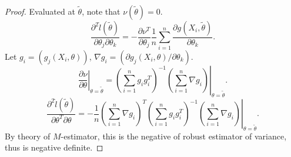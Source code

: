 \begin{proof}
Evaluated at $\tilde{\theta}$, note that $\nu\left(\tilde{\theta}\right)=0$.
\[
\frac{\partial^{2}\hat{l}\left(\tilde{\theta}\right)}{\partial\theta_{j}\partial\theta_{k}}=-\frac{\partial\nu^{T}}{\partial\theta_{j}}\frac{1}{n}\sum_{i=1}^{n}\frac{\partial g\left(X_{i},\tilde{\theta}\right)}{\partial\theta_{k}}.
\]
Let $g_{i}=\left(g_{j}\left(X_{i},\theta\right)\right)$, $\nabla g_{i}=\left({\partial g_{j}\left(X_{i},\theta\right)} / {\partial\theta_{k}}\right)$.
\[
\left.\frac{\partial\nu}{\partial\theta}\right|_{\theta=\tilde{\theta}}=\left.\left(\sum_{i=1}^{n}g_{i}g_{i}^{T}\right)^{-1}\left(\sum_{i=1}^{n}\nabla g_{i}\right)\right|_{\theta=\tilde{\theta}}.
\]
\[
\frac{\partial^{2}\hat{l}\left(\tilde{\theta}\right)}{\partial\theta^{T}\partial\theta}=-\frac{1}{n}\left.\left(\sum_{i=1}^{n}\nabla g_{i}\right)^{T}\left(\sum_{i=1}^{n}g_{i}g_{i}^{T}\right)^{-1}\left(\sum_{i=1}^{n}\nabla g_{i}\right)\right|_{\theta=\tilde{\theta}}.
\]
By theory of $M$-estimator, this is the negative of robust estimator
of variance, thus is negative definite. 



\end{proof}
